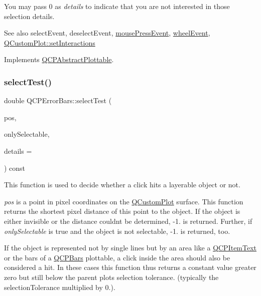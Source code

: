 You may pass 0 as {\itshape details} to indicate that you are not interested in those selection details.

\begin{DoxySeeAlso}{See also}
select\+Event, deselect\+Event, \hyperlink{class_q_c_p_layerable_af6567604818db90f4fd52822f8bc8376}{mouse\+Press\+Event}, \hyperlink{class_q_c_p_layerable_a47dfd7b8fd99c08ca54e09c362b6f022}{wheel\+Event}, \hyperlink{class_q_custom_plot_a5ee1e2f6ae27419deca53e75907c27e5}{Q\+Custom\+Plot\+::set\+Interactions} 
\end{DoxySeeAlso}


Implements \hyperlink{class_q_c_p_abstract_plottable_a38efe9641d972992a3d44204bc80ec1d}{Q\+C\+P\+Abstract\+Plottable}.

\mbox{\label{class_q_c_p_error_bars_ac1b6675ef43e32547a3cbcf7b7ac46ed}} 
\subsubsection{\texorpdfstring{select\+Test()}{selectTest()}\hspace{0.1cm}{\footnotesize\ttfamily [2/2]}}
{\footnotesize\ttfamily double Q\+C\+P\+Error\+Bars\+::select\+Test (\begin{DoxyParamCaption}\item[{const Q\+PointF \&}]{pos,  }\item[{bool}]{only\+Selectable,  }\item[{Q\+Variant $\ast$}]{details = {} }\end{DoxyParamCaption}) const\hspace{0.3cm}{\ttfamily [virtual]}}

This function is used to decide whether a click hits a layerable object or not.

{\itshape pos} is a point in pixel coordinates on the \hyperlink{class_q_custom_plot}{Q\+Custom\+Plot} surface. This function returns the shortest pixel distance of this point to the object. If the object is either invisible or the distance couldn\textquotesingle{}t be determined, -\/1. is returned. Further, if {\itshape only\+Selectable} is true and the object is not selectable, -\/1. is returned, too.

If the object is represented not by single lines but by an area like a \hyperlink{class_q_c_p_item_text}{Q\+C\+P\+Item\+Text} or the bars of a \hyperlink{class_q_c_p_bars}{Q\+C\+P\+Bars} plottable, a click inside the area should also be considered a hit. In these cases this function thus returns a constant value greater zero but still below the parent plot\textquotesingle{}s selection tolerance. (typically the selection\+Tolerance multiplied by 0.).

